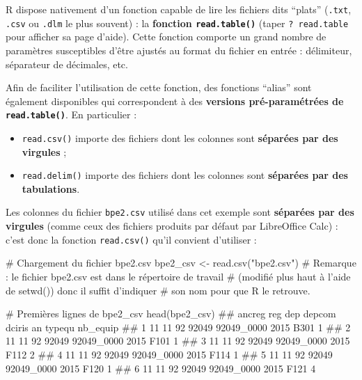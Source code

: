 \documentclass[12pt,twosided, notitlepage]{book}
\newenvironment{Shaded}{}{}
\newcommand{\CommentTok}[1]{\textcolor[rgb]{0.00,0.50,0.00}{#1}}
\newcommand{\KeywordTok}[1]{\textcolor[rgb]{0.00,0.00,1.00}{#1}}
\newcommand{\NormalTok}[1]{#1}
\newcommand{\StringTok}[1]{\textcolor[rgb]{0.00,0.50,0.50}{#1}}
\providecommand{\tightlist}{%
  \setlength{\itemsep}{0pt}\setlength{\parskip}{0pt}}
\renewenvironment{Shaded}{\begin{snugshade}}{\end{snugshade}}
\begin{document}
R dispose nativement d'un fonction capable de lire les fichiers dits
\enquote{plats} (\texttt{.txt}, \texttt{.csv} ou \texttt{.dlm} le plus
souvent) : la \textbf{fonction
\texttt{read.table()}} (taper
\texttt{?\ read.table} pour afficher sa page d'aide). Cette fonction
comporte un grand nombre de paramètres susceptibles d'être ajustés au
format du fichier en entrée : délimiteur, séparateur de décimales, etc.

Afin de faciliter l'utilisation de cette fonction, des fonctions
\enquote{alias} sont également disponibles qui correspondent à des
\textbf{versions pré-paramétrées de \texttt{read.table()}}. En
particulier :

\begin{itemize}
\tightlist
\item
  \texttt{read.csv()} importe des
  fichiers dont les colonnes sont \textbf{séparées par des virgules} ;
\item
  \texttt{read.delim()} importe des
  fichiers dont les colonnes sont \textbf{séparées par des tabulations}.
\end{itemize}

Les colonnes du fichier \texttt{bpe2.csv} utilisé dans cet exemple sont
\textbf{séparées par des virgules} (comme ceux des fichiers produits par
défaut par LibreOffice Calc) : c'est donc la fonction
\texttt{read.csv()} qu'il convient d'utiliser :

\begin{Shaded}
\begin{Highlighting}[]
\CommentTok{# Chargement du fichier bpe2.csv}
\NormalTok{bpe2_csv <-}\StringTok{ }\KeywordTok{read.csv}\NormalTok{(}\StringTok{"bpe2.csv"}\NormalTok{)}
\CommentTok{# Remarque : le fichier bpe2.csv est dans le répertoire de travail}
\CommentTok{# (modifié plus haut à l'aide de setwd()) donc il suffit d'indiquer }
\CommentTok{# son nom pour que R le retrouve. }

\CommentTok{# Premières lignes de bpe2_csv}
\KeywordTok{head}\NormalTok{(bpe2_csv)}
\NormalTok{  ##   ancreg reg dep depcom     dciris   an typequ nb_equip}
\NormalTok{  ## 1     11  11  92  92049 92049_0000 2015   B301        1}
\NormalTok{  ## 2     11  11  92  92049 92049_0000 2015   F101        1}
\NormalTok{  ## 3     11  11  92  92049 92049_0000 2015   F112        2}
\NormalTok{  ## 4     11  11  92  92049 92049_0000 2015   F114        1}
\NormalTok{  ## 5     11  11  92  92049 92049_0000 2015   F120        1}
\NormalTok{  ## 6     11  11  92  92049 92049_0000 2015   F121        4}
\end{Highlighting}
\end{Shaded}
\end{document}
